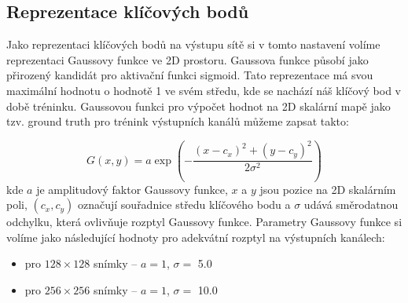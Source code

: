 \subsection{Reprezentace klíčových bodů}

Jako reprezentaci klíčových bodů na výstupu sítě si v tomto nastavení volíme reprezentaci Gaussovy funkce ve 2D prostoru. Gaussova funkce působí jako přirozený kandidát pro aktivační funkci sigmoid. Tato reprezentace má svou maximální hodnotu o hodnotě 1 ve svém středu, kde se nachází náš klíčový bod v době tréninku. Gaussovou funkci pro výpočet hodnot na 2D skalární mapě jako tzv. ground truth pro trénink výstupních kanálů můžeme zapsat takto:

\begin{equation}
    G(x, y) = a \exp\left(-\frac{(x - c_x)^2 + (y - c_y)^2}{2\sigma^2}\right)
\end{equation}
kde $a$ je amplitudový faktor Gaussovy funkce, $x$ a $y$ jsou pozice na 2D skalárním poli, $(c_x, c_y)$ označují souřadnice středu klíčového bodu a $\sigma$ udává směrodatnou odchylku, která ovlivňuje rozptyl Gaussovy funkce. Parametry Gaussovy funkce si volíme jako následující hodnoty pro adekvátní rozptyl na výstupních kanálech: 
\begin{itemize}
    \item pro $128 \times 128$ snímky -- $a=1$, $\sigma=$ 5.0
    \item pro $256 \times 256$ snímky -- $a=1$, $\sigma=$ 10.0
\end{itemize}

